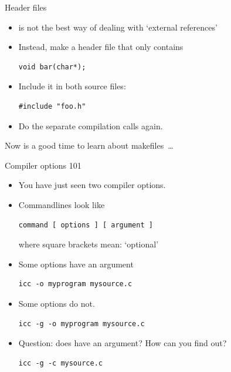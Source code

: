 \documentclass[11pt,headernav]{beamer}
\begin{document}
\begin{numberedframe}{Header files}
  \begin{itemize}
  \item
     is not the best way of dealing with `external references'
  \item Instead, make a header file  that only contains
\begin{lstlisting}
void bar(char*);
\end{lstlisting}
\item Include it in both source files:
\begin{lstlisting}
#include "foo.h"
\end{lstlisting}
\item Do the separate compilation calls again.
  \end{itemize}
  Now is a good time to learn about makefiles~\ldots
\end{numberedframe}

\begin{numberedframe}{Compiler options 101}
  \label{sl-tut:option1}
  \begin{itemize}
  \item You have just seen two compiler options.
  \item Commandlines look like
\begin{verbatim}
command [ options ] [ argument ]
\end{verbatim}
where square brackets mean: `optional'
\item Some options have an argument
\begin{verbatim}
icc -o myprogram mysource.c
\end{verbatim}
\item Some options do not.
\begin{verbatim}
icc -g -o myprogram mysource.c
\end{verbatim}
\item Question: does  have an argument? How can you find out?
\begin{verbatim}
icc -g -c mysource.c
\end{verbatim}
  \end{itemize}
\end{numberedframe}
\end{document}

